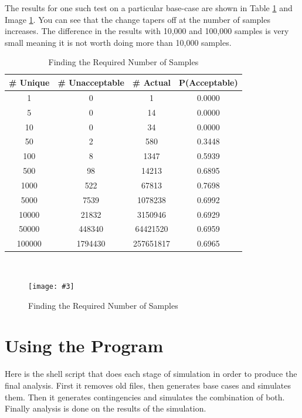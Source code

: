 \documentclass[a4paper,oneside,12pt]{report}
\newcommand{\image}[3] {
  \begin{figure}
    \begin{center}
      \texttt{[image: \#3]}
      \caption{#2}
      \label{#1}
    \end{center}
  \end{figure}
}
\begin{document}
The results for one such test on a particular base-case are shown in Table \ref{table_sample_size} and Image \ref{imgsamplesize}. You can see that the
change tapers off at the number of samples increases. The difference in
the results with 10,000 and 100,000 samples is very small meaning it is
not worth doing more than 10,000 samples.


\begin{table}[htbp]
\caption{Finding the Required Number of Samples}
\label{table_sample_size}
\centering
\begin{tabular}{c||c||c||c}
\bfseries \# Unique & \bfseries \# Unacceptable & \bfseries \# Actual & \bfseries P(Acceptable) \\
\hline \hline
1      &  0        &  1          &  0.0000  \\
5      &  0        &  14         &  0.0000  \\
10     &  0        &  34         &  0.0000  \\
50     &  2        &  580        &  0.3448  \\
100    &  8        &  1347       &  0.5939  \\
500    &  98       &  14213      &  0.6895  \\
1000   &  522      &  67813      &  0.7698  \\
5000   &  7539     &  1078238    &  0.6992  \\
10000  &  21832    &  3150946    &  0.6929  \\
50000  &  448340   &  64421520   &  0.6959  \\
100000 &  1794430  &  257651817  &  0.6965  \\
\hline
\end{tabular}\\
\end{table}

\image{imgsamplesize}{Finding the Required Number of Samples}{samplesize.png}

\section{Using the Program} \label{sec_prog_use}

Here is the shell script that does each stage of simulation in order to
produce the final analysis. First it removes old files, then generates
base cases and simulates them. Then it generates contingencies and
simulates the combination of both. Finally analysis is done on the
results of the simulation.
\end{document}
